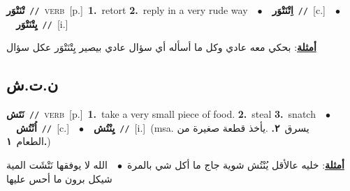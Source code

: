 \documentclass[10pt,a4paper,twoside]{article} %
\begin{document}
\begin{multicols}{2}
{\setlength\topsep{0pt}\textbf{\foreignlanguage{arabic}{تْنَتْوَر}}\ {\color{gray}\texttt{//}\color{black}}\ \textsc{verb}\ [p.]\ \textbf{1.}~retort  \textbf{2.}~reply in a very rude way\ \ $\bullet$\ \ \setlength\topsep{0pt}\textbf{\foreignlanguage{arabic}{اِتْنَتْوَر}}\ {\color{gray}\texttt{//}\color{black}}\ [c.]\ \ $\bullet$\ \ \setlength\topsep{0pt}\textbf{\foreignlanguage{arabic}{يِتْنَتْوَر}}\ {\color{gray}\texttt{//}\color{black}}\ [i.]\  \begin{flushright}\color{gray}\foreignlanguage{arabic}{\textbf{\underline{\foreignlanguage{arabic}{أمثلة}}}: بحكي معه عادي وكل ما أسأله أي سؤال عادي بيصير يِتْنَتْوَر عكل سؤال}\end{flushright}\color{black}} \vspace{2mm}

\vspace{-3mm}
\subsection*{\color{blue}\foreignlanguage{arabic}{ن.ت.ش}\color{blue}{}} 

{\setlength\topsep{0pt}\textbf{\foreignlanguage{arabic}{نَتَش}}\ {\color{gray}\texttt{//}\color{black}}\ \textsc{verb}\ [p.]\ \textbf{1.}~take a very small piece of food.  \textbf{2.}~steal  \textbf{3.}~snatch\ \ $\bullet$\ \ \setlength\topsep{0pt}\textbf{\foreignlanguage{arabic}{اُنْتُش}}\ {\color{gray}\texttt{//}\color{black}}\ [c.]\ \ $\bullet$\ \ \setlength\topsep{0pt}\textbf{\foreignlanguage{arabic}{يِنْتُش}}\ {\color{gray}\texttt{//}\color{black}}\ [i.]\ \color{gray}(msa. \foreignlanguage{arabic}{يسرق}~\foreignlanguage{arabic}{\textbf{٢.}}  .\foreignlanguage{arabic}{يأخذ قطعة صغيرة من الطعام}~\foreignlanguage{arabic}{\textbf{١.}})\color{black}\  \begin{flushright}\color{gray}\foreignlanguage{arabic}{\textbf{\underline{\foreignlanguage{arabic}{أمثلة}}}: خليه عالأقل يُنْتُش شوية جاج ما أكل شي بالمرة\ $\bullet$\ \  الله لا يوفقها نَتْشَت المية شيكل برون ما أحس عليها}\end{flushright}\color{black}} \vspace{2mm}


\end{multicols}
\end{document}
